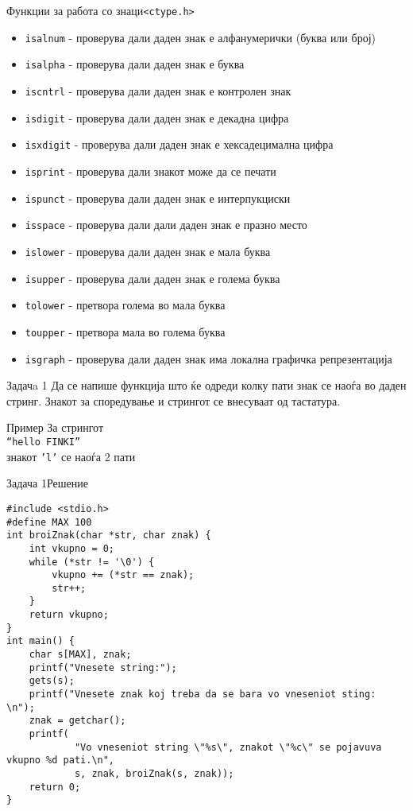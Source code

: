 \begin{frame}[shrink=10]{Функции за работа со знаци}{\texttt{<ctype.h>}}
\begin{itemize}
  \item \texttt{isalnum} - проверува дали даден знак е алфанумерички (буква или
  број)
  \item \texttt{isalpha} - проверува дали даден знак е буква
  \item \texttt{iscntrl} - проверува дали даден знак е контролен знак
  \item \texttt{isdigit} - проверува дали даден знак е декадна цифра
  \item \texttt{isxdigit} - проверува дали даден знак е хексадецимална цифра
  \item \texttt{isprint} - проверува дали знакот може да се печати
  \item \texttt{ispunct} - проверува дали даден знак е интерпукциски
  \item \texttt{isspace} - проверува дали дали даден знак е празно место
  \item \texttt{islower} - проверува дали даден знак е мала буква
  \item \texttt{isupper} - проверува дали даден знак е голема буква
  \item \texttt{tolower} - претвора голема во мала буква
  \item \texttt{toupper}  - претвора мала во голема буква
  \item \texttt{isgraph} - проверува дали даден знак има локална графичка
  репрезентација
\end{itemize}
\end{frame}




\begin{frame}{Задачa 1}
Да се напише функција што ќе одреди колку пати знак се наоѓа во даден стринг.
Знакот за споредување и стрингот се внесуваат од тастатура.
\begin{exampleblock}{Пример}
За стрингот\\
\texttt{``hello FINKI''}\\
знакот \texttt{'l'} се наоѓа 2 пати
\end{exampleblock}
\end{frame}

\begin{frame}[fragile]{Задача 1}{Решение}
\begin{lstlisting}
#include <stdio.h>
#define MAX 100
int broiZnak(char *str, char znak) {
    int vkupno = 0;
    while (*str != '\0') {
        vkupno += (*str == znak);
        str++;
    }
    return vkupno;
}
int main() {
    char s[MAX], znak;
    printf("Vnesete string:");
    gets(s);
    printf("Vnesete znak koj treba da se bara vo vneseniot sting: \n");
    znak = getchar();
    printf(
            "Vo vneseniot string \"%s\", znakot \"%c\" se pojavuva vkupno %d pati.\n",
            s, znak, broiZnak(s, znak));
    return 0;
}
\end{lstlisting}
\end{frame}

